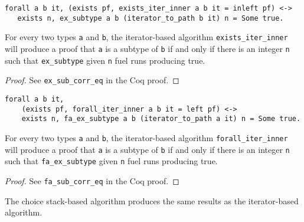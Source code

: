 \documentclass[a4paper,UKenglish]{lipics-v2018}
\begin{document}
\begin{lemma}
\begin{verbatim}
forall a b it, (exists pf, exists_iter_inner a b it = inleft pf) <->
   exists n, ex_subtype a b (iterator_to_path b it) n = Some true.
\end{verbatim}
For every two types \verb|a| and \verb|b|, the iterator-based algorithm
\verb|exists_iter_inner| will produce a proof that \verb|a| is a subtype
of \verb|b| if and only if there is an integer \verb|n| such that
 \verb|ex_subtype| given \verb|n| fuel runs producing true.
\end{lemma}
\begin{proof}
See \verb|ex_sub_corr_eq| in the Coq proof.
\end{proof}

\begin{lemma}
\begin{verbatim}
forall a b it,
    (exists pf, forall_iter_inner a b it = left pf) <->
    exists n, fa_ex_subtype a b (iterator_to_path a it) n = Some true.
\end{verbatim}
For every two types \verb|a| and \verb|b|, the iterator-based algorithm
\verb|forall_iter_inner| will produce a proof that \verb|a| is a subtype
of \verb|b| if and only if there is an integer \verb|n| such that
 \verb|fa_ex_subtype| given \verb|n| fuel runs producing true.
\end{lemma}
\begin{proof}
See \verb|fa_sub_corr_eq| in the Coq proof.
\end{proof}

The choice stack-based algorithm produces the same results as the 
iterator-based algorithm. 
\end{document}
